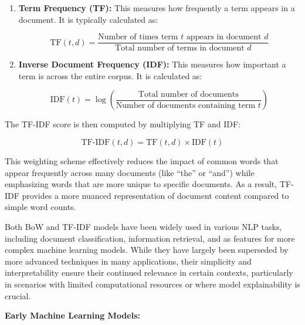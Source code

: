 \begin{enumerate}
    \item \textbf{Term Frequency (TF):} This measures how frequently a term appears in a document. It is typically calculated as:
    
    \begin{equation}
        \text{TF}(t,d) = \frac{\text{Number of times term } t \text{ appears in document } d}{\text{Total number of terms in document } d}
    \end{equation}

    \item \textbf{Inverse Document Frequency (IDF):} This measures how important a term is across the entire corpus. It is calculated as:
    
    \begin{equation}
        \text{IDF}(t) = \log\left(\frac{\text{Total number of documents}}{\text{Number of documents containing term } t}\right)
    \end{equation}
\end{enumerate}

The TF-IDF score is then computed by multiplying TF and IDF:

\begin{equation}
    \text{TF-IDF}(t,d) = \text{TF}(t,d) \times \text{IDF}(t)
\end{equation}

This weighting scheme effectively reduces the impact of common words that appear frequently across many documents (like ``the'' or ``and'') while emphasizing words that are more unique to specific documents. As a result, TF-IDF provides a more nuanced representation of document content compared to simple word counts.

Both BoW and TF-IDF models have been widely used in various NLP tasks, including document classification, information retrieval, and as features for more complex machine learning models. While they have largely been superseded by more advanced techniques in many applications, their simplicity and interpretability ensure their continued relevance in certain contexts, particularly in scenarios with limited computational resources or where model explainability is crucial.

\textbf{Early Machine Learning Models:} %

